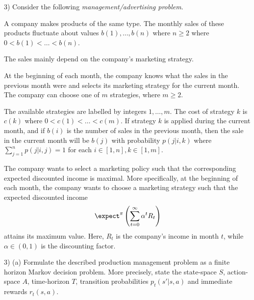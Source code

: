 \documentclass[11pt,a4paper]{article}
\begin{document}
\begin{question}{3)}
  Consider the following \textit{management/advertising problem}.
  \par A company makes products of the same type. The monthly sales of these products fluctuate about values $b(1),\dots,b(n)$ where $n\geq2$ where $0<b(1)<\dots<b(n)$.
  \par The sales mainly depend on the company's marketing strategy.
  \par At the beginning of each month, the company knows what the sales in the previous month were and selects its marketing strategy for the current month. The company can choose one of $m$ strategies, where $m\geq2$.
  \par The available strategies are labelled by integers $1,\dots,m$. The cost of strategy $k$ is $c(k)$ where $0<c(1)<\dots<c(m)$.
  If strategy $k$ is applied during the current month, and if $b(i)$ is the number of sales in the previous month, then the sale in the current month will be $b(j)$ with probability $p(j|i,k)$ where $\sum_{j=1}^np(j|i,j)=1$ for each $i\in[1,n],k\in[1,m]$.
  \par The company wants to select a marketing policy such that the corresponding expected discounted income is maximal. More specifically, at the beginning of each month, the company wants to choose a marketing strategy such that the expected discounted income
  \[ \expect^\pi\left(\sum_{t=0}^\infty\alpha^tR_t\right) \]
  attains its maximum value. Here, $R_t$ is the company's income in month $t$, while $\alpha\in(0,1)$ is the discounting factor.
\end{question}

\begin{question}{3) (a)}
  Formulate the described production management problem as a finite horizon Markov decision problem. More precisely, state the state-space $S$, action-space $A$, time-horizon $T$, transition probabilities $p_t(s'|s,a)$ and immediate rewards $r_t(s,a)$.
\end{question}
\end{document}

